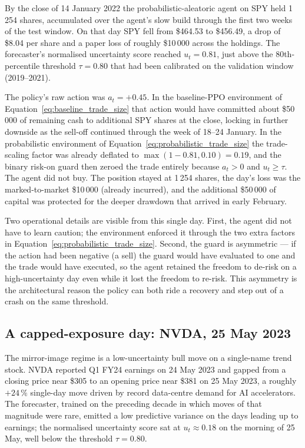 By the close of 14 January 2022 the probabilistic-aleatoric agent on SPY held 1\,254 shares, accumulated over the agent's slow build through the first two weeks of the test window. On that day SPY fell from \$464.53 to \$456.49, a drop of \$8.04 per share and a paper loss of roughly \$10\,000 across the holdings. The forecaster's normalised uncertainty score reached $u_t = 0.81$, just above the 80th-percentile threshold $\tau = 0.80$ that had been calibrated on the validation window (2019--2021).

The policy's raw action was $a_t = +0.45$. In the baseline-PPO environment of Equation~\ref{eq:baseline_trade_size} that action would have committed about \$50\,000 of remaining cash to additional SPY shares at the close, locking in further downside as the sell-off continued through the week of 18--24 January. In the probabilistic environment of Equation~\ref{eq:probabilistic_trade_size} the trade-scaling factor was already deflated to $\max(1 - 0.81, 0.10) = 0.19$, and the binary risk-on guard then zeroed the trade entirely because $a_t > 0$ and $u_t \geq \tau$. The agent did not buy. The position stayed at 1\,254 shares, the day's loss was the marked-to-market \$10\,000 (already incurred), and the additional \$50\,000 of capital was protected for the deeper drawdown that arrived in early February.

Two operational details are visible from this single day. First, the agent did not have to learn caution; the environment enforced it through the two extra factors in Equation~\ref{eq:probabilistic_trade_size}. Second, the guard is asymmetric --- if the action had been negative (a sell) the guard would have evaluated to one and the trade would have executed, so the agent retained the freedom to de-risk on a high-uncertainty day even while it lost the freedom to re-risk. This asymmetry is the architectural reason the policy can both ride a recovery and step out of a crash on the same threshold.

\subsection{A capped-exposure day: NVDA, 25 May 2023}
\label{sec:walkthrough_nvda_capped}

The mirror-image regime is a low-uncertainty bull move on a single-name trend stock. NVDA reported Q1 FY24 earnings on 24 May 2023 and gapped from a closing price near \$305 to an opening price near \$381 on 25 May 2023, a roughly $+24\,\%$ single-day move driven by record data-centre demand for AI accelerators. The forecaster, trained on the preceding decade in which moves of that magnitude were rare, emitted a low predictive variance on the days leading up to earnings; the normalised uncertainty score sat at $u_t \approx 0.18$ on the morning of 25 May, well below the threshold $\tau = 0.80$.

